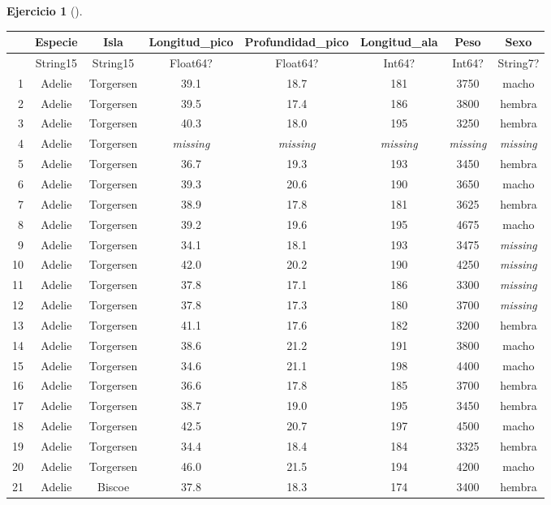 \documentclass[
  a4paper,
]{scrreport}
\theoremstyle{definition}
\newtheorem{exercise}{Ejercicio}[chapter]
\theoremstyle{remark}
\begin{document}
\begin{exercise}[]
\begin{enumerate}
\begin{tcolorbox}
  \begin{tabular}{r|ccccccc}
      & Especie & Isla & Longitud\_pico & Profundidad\_pico & Longitud\_ala & Peso & Sexo\\
      \hline
      & String15 & String15 & Float64? & Float64? & Int64? & Int64? & String7?\\
      \hline
      1 & Adelie & Torgersen & 39.1 & 18.7 & 181 & 3750 & macho \\
      2 & Adelie & Torgersen & 39.5 & 17.4 & 186 & 3800 & hembra \\
      3 & Adelie & Torgersen & 40.3 & 18.0 & 195 & 3250 & hembra \\
      4 & Adelie & Torgersen & \emph{missing} & \emph{missing} & \emph{missing} & \emph{missing} & \emph{missing} \\
      5 & Adelie & Torgersen & 36.7 & 19.3 & 193 & 3450 & hembra \\
      6 & Adelie & Torgersen & 39.3 & 20.6 & 190 & 3650 & macho \\
      7 & Adelie & Torgersen & 38.9 & 17.8 & 181 & 3625 & hembra \\
      8 & Adelie & Torgersen & 39.2 & 19.6 & 195 & 4675 & macho \\
      9 & Adelie & Torgersen & 34.1 & 18.1 & 193 & 3475 & \emph{missing} \\
      10 & Adelie & Torgersen & 42.0 & 20.2 & 190 & 4250 & \emph{missing} \\
      11 & Adelie & Torgersen & 37.8 & 17.1 & 186 & 3300 & \emph{missing} \\
      12 & Adelie & Torgersen & 37.8 & 17.3 & 180 & 3700 & \emph{missing} \\
      13 & Adelie & Torgersen & 41.1 & 17.6 & 182 & 3200 & hembra \\
      14 & Adelie & Torgersen & 38.6 & 21.2 & 191 & 3800 & macho \\
      15 & Adelie & Torgersen & 34.6 & 21.1 & 198 & 4400 & macho \\
      16 & Adelie & Torgersen & 36.6 & 17.8 & 185 & 3700 & hembra \\
      17 & Adelie & Torgersen & 38.7 & 19.0 & 195 & 3450 & hembra \\
      18 & Adelie & Torgersen & 42.5 & 20.7 & 197 & 4500 & macho \\
      19 & Adelie & Torgersen & 34.4 & 18.4 & 184 & 3325 & hembra \\
      20 & Adelie & Torgersen & 46.0 & 21.5 & 194 & 4200 & macho \\
      21 & Adelie & Biscoe & 37.8 & 18.3 & 174 & 3400 & hembra \\

\end{tabular}
\end{tcolorbox}
\end{enumerate}
\end{exercise}
\end{document}

